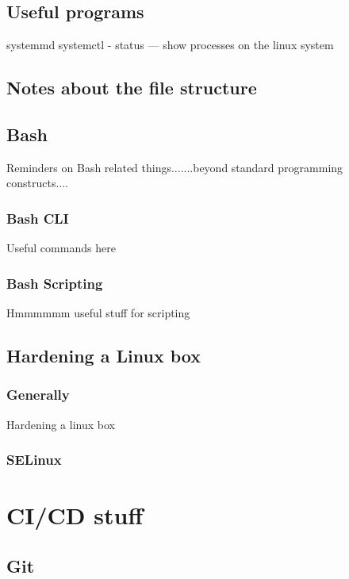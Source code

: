 \documentclass[a4paper, 11pt]{book}
\begin{document}
    \section{Useful programs}
    systemmd
    systemctl - status --- show processes on the linux system


    \section{Notes about the file structure}

    \section{Bash}
    Reminders on Bash related things.......beyond standard programming constructs....

    \subsection{Bash CLI}
    Useful commands here

    \subsection{Bash Scripting}
    Hmmmmmm useful stuff for scripting

    \section{Hardening a Linux box}
    \subsection{Generally}
    Hardening a linux box
    \subsection{SELinux}



    \chapter{CI/CD stuff}


    \section{Git}
\end{document}
